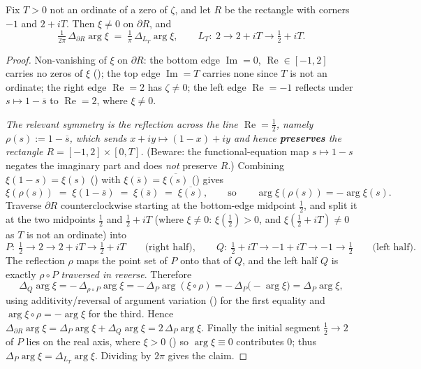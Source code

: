 \begin{lemma}
\label{lem:nf_halving}
\leanok
{}
Fix $T>0$ not an ordinate of a zero of $\zeta$, and let $R$ be the rectangle with
corners $-1$ and $2+iT$. Then $\xi\neq0$ on $\partial R$, and
\[
  \tfrac{1}{2\pi}\,\Delta_{\partial R}\arg\xi
  \;=\; \tfrac1\pi\,\Delta_{L_T}\arg\xi ,
  \qquad L_T:\ 2 \to 2+iT \to \tfrac12+iT .
\]
\end{lemma}

\begin{proof}
\leanok
{}
Non-vanishing of $\xi$ on $\partial R$: the bottom edge $\operatorname{Im}=0$,
$\operatorname{Re}\in[-1,2]$ carries no zeros of $\xi$ ();
the
top edge $\operatorname{Im}=T$ carries none since $T$ is not an ordinate; the right
edge $\operatorname{Re}=2$ has $\zeta\neq0$; the left edge $\operatorname{Re}=-1$
reflects under $s\mapsto1-\overline{s}$ to $\operatorname{Re}=2$, where $\xi\neq0$.

\emph{The relevant symmetry is the reflection across the line
$\operatorname{Re}=\tfrac12$, namely $\rho(s):=1-\overline{s}$, which sends
$x+iy\mapsto(1-x)+iy$ and hence \textbf{preserves} the rectangle $R=[-1,2]\times[0,T]$.}
(Beware: the functional-equation map $s\mapsto1-s$ negates the imaginary part and does
\emph{not} preserve $R$.) Combining $\xi(1-s)=\xi(s)$ () with
$\xi(\overline{s})=\overline{\xi(s)}$ () gives
\[
  \xi(\rho(s)) \;=\; \xi(1-\overline{s}) \;=\; \xi(\overline{s}) \;=\;
  \overline{\xi(s)},
  \qquad\text{so}\qquad \arg\xi(\rho(s)) = -\arg\xi(s).
\]
Traverse $\partial R$ counterclockwise starting at the bottom-edge midpoint
$\tfrac12$, and split it at the two midpoints $\tfrac12$ and $\tfrac12+iT$ (where
$\xi\neq0$: $\xi(\tfrac12)>0$, and $\xi(\tfrac12+iT)\neq0$ as $T$ is not an ordinate)
into
\[
  P:\ \tfrac12\to2\to2+iT\to\tfrac12+iT
  \qquad\text{(right half)},\qquad
  Q:\ \tfrac12+iT\to-1+iT\to-1\to\tfrac12
  \qquad\text{(left half)}.
\]
The reflection $\rho$ maps the point set of $P$ onto that of $Q$, and the left half
$Q$ is exactly $\rho\circ P$ \emph{traversed in reverse}. Therefore
\[
  \Delta_{Q}\arg\xi
  = -\,\Delta_{\rho\circ P}\arg\xi
  = -\,\Delta_{P}\arg(\xi\circ\rho)
  = -\,\Delta_{P}\bigl(-\arg\xi\bigr)
  = \Delta_{P}\arg\xi,
\]
using additivity/reversal of argument variation () for the
first equality and $\arg\xi\circ\rho=-\arg\xi$ for the third. Hence
$\Delta_{\partial R}\arg\xi = \Delta_P\arg\xi + \Delta_Q\arg\xi = 2\,\Delta_P\arg\xi$.
Finally the initial segment $\tfrac12\to2$ of $P$ lies on the real axis, where
$\xi>0$ () so $\arg\xi\equiv0$ contributes $0$; thus
$\Delta_P\arg\xi = \Delta_{L_T}\arg\xi$. Dividing by $2\pi$ gives the claim.
\end{proof}

